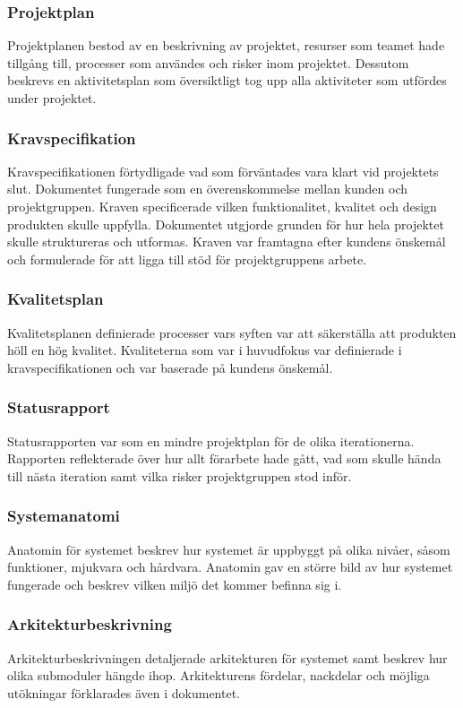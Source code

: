 \subsubsection*{Projektplan}
Projektplanen bestod av en beskrivning av projektet, resurser som teamet hade tillgång till, processer som användes och risker inom projektet. Dessutom beskrevs en aktivitetsplan som översiktligt tog upp alla aktiviteter som utfördes under projektet.

\subsubsection*{Kravspecifikation}
Kravspecifikationen förtydligade vad som förväntades vara klart vid projektets slut. Dokumentet fungerade som en överenskommelse mellan kunden och projektgruppen. Kraven specificerade vilken funktionalitet, kvalitet och design produkten skulle uppfylla. Dokumentet utgjorde grunden för hur hela projektet skulle struktureras och utformas. Kraven var framtagna efter kundens önskemål och formulerade för att ligga till stöd för projektgruppens arbete.

\subsubsection*{Kvalitetsplan}
Kvalitetsplanen definierade processer vars syften var att säkerställa att produkten höll en hög kvalitet. Kvaliteterna som var i huvudfokus var definierade i kravspecifikationen och var baserade på kundens önskemål.

\subsubsection*{Statusrapport}
Statusrapporten var som en mindre projektplan för de olika iterationerna. Rapporten reflekterade över hur allt förarbete hade gått, vad som skulle hända till nästa iteration samt vilka risker projektgruppen stod inför.

\subsubsection*{Systemanatomi}
Anatomin för systemet beskrev hur systemet är uppbyggt på olika nivåer, såsom funktioner, mjukvara och hårdvara. Anatomin gav en större bild av hur systemet fungerade och beskrev vilken miljö det kommer befinna sig i.

\subsubsection*{Arkitekturbeskrivning}
Arkitekturbeskrivningen detaljerade arkitekturen för systemet samt beskrev hur olika submoduler hängde ihop. Arkitekturens fördelar, nackdelar och möjliga utökningar förklarades även i dokumentet.

